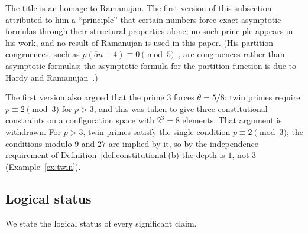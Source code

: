 \documentclass[12pt]{amsart}
\theoremstyle{plain}
\theoremstyle{definition}
\theoremstyle{remark}
\begin{document}
The title is an homage to Ramanujan. The first version of this subsection
attributed to him a ``principle'' that certain numbers force exact asymptotic
formulas through their structural properties alone; no such principle appears in
his work, and no result of Ramanujan is used in this paper. (His partition
congruences, such as $p(5n+4) \equiv 0 \pmod{5}$~\cite{Ramanujan1919}, are
congruences rather than asymptotic formulas; the asymptotic formula for the
partition function is due to Hardy and Ramanujan~\cite{HardyRamanujan1918}.)

The first version also argued that the prime $3$ forces $\theta = 5/8$: twin
primes require $p \equiv 2 \pmod{3}$ for $p > 3$, and this was taken to give
three constitutional constraints on a configuration space with $2^3 = 8$
elements. That argument is withdrawn. For $p > 3$, twin primes satisfy the
single condition $p \equiv 2 \pmod{3}$; the conditions modulo $9$ and $27$ are
implied by it, so by the independence requirement of
Definition~\ref{def:constitutional}(b) the depth is $1$, not $3$
(Example~\ref{ex:twin}).

\subsection{Logical status}
\label{sec:logstatus}

We state the logical status of every significant claim.
\end{document}
